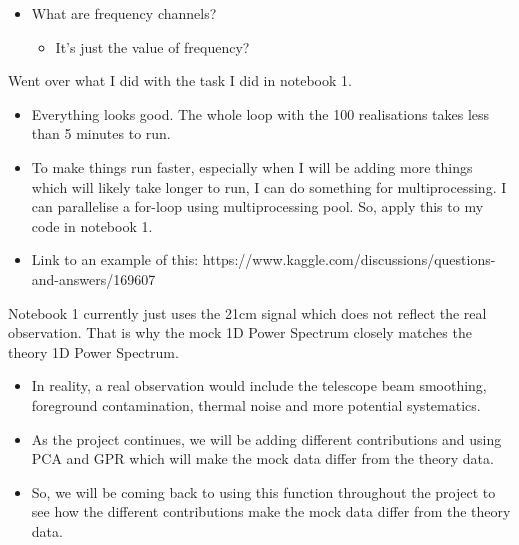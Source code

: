 \begin{itemize}
\begin{itemize}
\begin{itemize}
            \item The HI signal is redshifted so the original source frequency is broadened. When we measure this frequency, that means it is correlated with the frequencies directly next to it. Hence, broad and thick lines. 
            \item The thin line from the noise graph means that the frequency is not correlated with any other frequency but itself.
        \end{itemize}
        \item What are frequency channels?
        \begin{itemize}
            \item It's just the value of frequency? 
        \end{itemize}
        \end{itemize}
    \end{itemize}
\item Went over what I did with the task I did in notebook 1.
\begin{itemize}
    \item Everything looks good. The whole loop with the 100 realisations takes less than 5 minutes to run. 
    \item To make things run faster, especially when I will be adding more things which will likely take longer to run, I can do something for multiprocessing. I can parallelise a for-loop using multiprocessing pool. So, apply this to my code in notebook 1.
    \item Link to an example of this: https://www.kaggle.com/discussions/questions-and-answers/169607 
\end{itemize}
\item Notebook 1 currently just uses the 21cm signal which does not reflect the real observation. That is why the mock 1D Power Spectrum closely matches the theory 1D Power Spectrum. 
\begin{itemize}
    \item In reality, a real observation would include the telescope beam smoothing, foreground contamination, thermal noise and more potential systematics.
    \item As the project continues, we will be adding different contributions and using PCA and GPR which will make the mock data differ from the theory data. 
    \item So, we will be coming back to using this function throughout the project to see how the different contributions make the mock data differ from the theory data.
\end{itemize}
